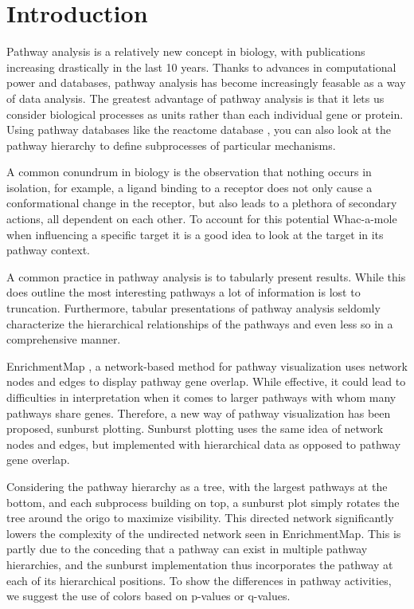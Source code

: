 \documentclass[11pt]{article}
\begin{document}
\maketitle


\begin{abstract}

\end{abstract}

\section*{Introduction}
  Pathway analysis is a relatively new concept in biology, with publications increasing drastically in the last 10 years. Thanks to advances in computational power and databases, pathway analysis has become increasingly feasable as a way of data analysis. The greatest advantage of pathway analysis is that it lets us consider biological processes as units rather than each individual gene or protein. Using pathway databases like the reactome database \cite{reactome}, you can also look at the pathway hierarchy to define subprocesses of particular mechanisms.

  A common conundrum in biology is the observation that nothing occurs in isolation, for example, a ligand binding to a receptor does not only cause a conformational change in the receptor, but also leads to a plethora of secondary actions, all dependent on each other. To account for this potential Whac-a-mole when influencing a specific target it is a good idea to look at the target in its pathway context.

  A common practice in pathway analysis is to tabularly present results. While this does outline the most interesting pathways a lot of information is lost to truncation. Furthermore, tabular presentations of pathway analysis seldomly characterize the hierarchical relationships of the pathways and even less so in a comprehensive manner.

  EnrichmentMap \cite{enrichmentmap}, a network-based method for pathway visualization uses network nodes and edges to display pathway gene overlap. While effective, it could lead to difficulties in interpretation when it comes to larger pathways with whom many pathways share genes. Therefore, a new way of pathway visualization has been proposed, sunburst plotting. Sunburst plotting uses the same idea of network nodes and edges, but implemented with hierarchical data as opposed to pathway gene overlap.

  Considering the pathway hierarchy as a tree, with the largest pathways at the bottom, and each subprocess building on top, a sunburst plot simply rotates the tree around the origo to maximize visibility. This directed network significantly lowers the complexity of the undirected network seen in EnrichmentMap. This is partly due to the conceding that a pathway can exist in multiple pathway hierarchies, and the sunburst implementation thus incorporates the pathway at each of its hierarchical positions. To show the differences in pathway activities, we suggest the use of colors based on p-values or q-values.
\end{document}
